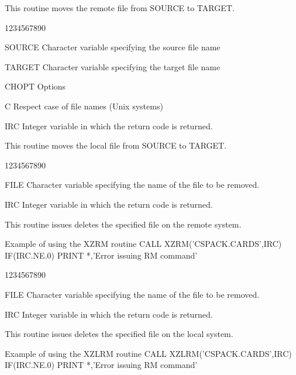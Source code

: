 \par
This routine moves the remote file from SOURCE to TARGET.
\begin{DLtt}{1234567890}
\item[SOURCE]Character variable specifying the source file name
\item[TARGET]Character variable specifying the target file name
\item[CHOPT]Options
\begin{DLtt}{12}
\item[C]Respect case of file names (Unix systems)
\end{DLtt}
\item[IRC]Integer variable in which the return code is returned.
\end{DLtt}
\par
This routine moves the local file from SOURCE to TARGET.
\begin{DLtt}{1234567890}
\item[FILE]Character variable specifying the name of the file to be removed.
\item[IRC]Integer variable in which the return code is returned.
\end{DLtt}
\par
This routine issues deletes the specified file on the remote system.
\begin{XMPt}{Example of using the XZRM routine}
      CALL XZRM('CSPACK.CARDS',IRC)
      IF(IRC.NE.0)  PRINT *,'Error issuing RM command'
\end{XMPt}
\begin{DLtt}{1234567890}
\item[FILE]Character variable specifying the name of the file to be removed.
\item[IRC]Integer variable in which the return code is returned.
\end{DLtt}
\par
This routine issues deletes the specified file on the local system.
\begin{XMPt}{Example of using the XZLRM routine}
      CALL XZLRM('CSPACK.CARDS',IRC)
      IF(IRC.NE.0)  PRINT *,'Error issuing RM command'
\end{XMPt}
